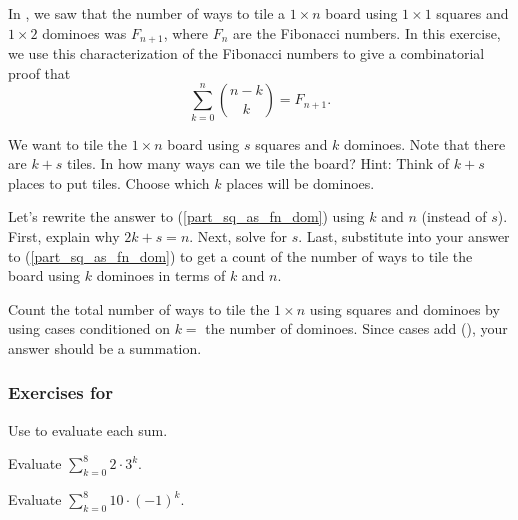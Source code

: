 \begin{exer}[\exerE] %
\label{exer_fib_in_pascal}
    In , we saw that the number of ways to tile a $1 \times n$ board using $1 \times 1$ squares and $1 \times 2$ dominoes was $F_{n+1}$, where $F_n$ are the Fibonacci numbers.  In this exercise, we use this characterization of the Fibonacci numbers to give a combinatorial proof that $$\sum_{k = 0}^n \binom{n-k}{k} = F_{n+1}.$$
        \begin{exerpart}
            \item \label{part_sq_as_fn_dom} We want to tile the $1 \times n$ board using $s$ squares and $k$ dominoes. Note that there are $k+s$ tiles. In how many ways can we tile the board?  Hint: Think of $k+s$ places to put tiles.  Choose which $k$ places will be dominoes. %
            \item Let's rewrite the answer to (\ref{part_sq_as_fn_dom}) using $k$ and $n$ (instead of $s$).  First, explain why $2k+s=n$.  Next, solve for $s$. Last, substitute into your answer to (\ref{part_sq_as_fn_dom}) to get a count of the number of ways to tile the board using $k$ dominoes in terms of $k$ and $n$.
            \item Count the total number of ways to tile the $1 \times n$ using squares and dominoes by using cases conditioned on $k=$ the number of dominoes.  Since cases add (), your answer should be a summation.
\end{exerpart}
\end{exer}


\subsubsection*{Exercises for  \subspecialsum}

\begin{exer}[\exerP] %
\label{exer_eval_sum_formulas_geom}
    Use  to evaluate each sum.
        \begin{exerpart}
            \item Evaluate $\displaystyle \sum_{k=0}^{8}2 \cdot 3^k$.
            \item Evaluate $\displaystyle \sum_{k=0}^{8}10 \cdot (-1)^k$.
        \end{exerpart}
\end{exer}

